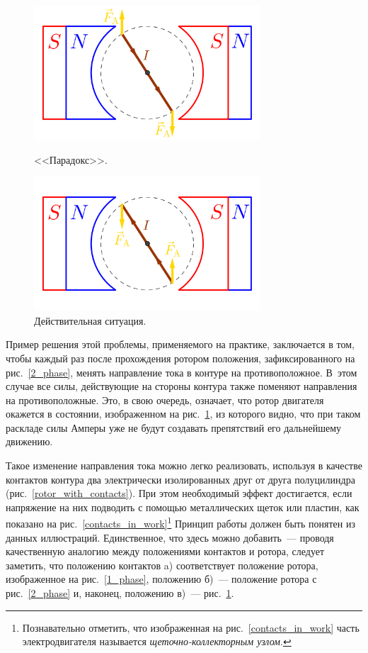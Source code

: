 \documentclass[12pt, a4paper, openany]{extarticle}
\begin{document}
\begin{figure}[h]
	\begin{center}
		\begin{minipage}[h]{0.49\linewidth}
			\centering\includegraphics[height=5cm]{pics/phase_3.png}
			\caption{<<Парадокс>>.}
			\label{3_phase} 
		\end{minipage}
		\hfill 
		\begin{minipage}[h]{0.49\linewidth}
			\centering\includegraphics[height=5cm]{pics/phase_4.png}
			\caption{Действительная ситуация.}
			\label{4_phase}
		\end{minipage}
	\end{center}
\end{figure}

Пример решения этой проблемы, применяемого на практике, заключается в том, чтобы каждый раз после прохождения ротором положения, зафиксированного на рис.~\ref{2_phase}, менять направление тока в контуре на противоположное. 
В~этом случае все силы, действующие на стороны контура также поменяют направления на противоположные. 
Это, в свою очередь, означает, что ротор двигателя окажется в состоянии, изображенном на рис.~\ref{4_phase}, из которого видно, что при таком раскладе силы Амперы уже не будут создавать препятствий его дальнейшему движению.

Такое изменение направления тока можно легко реализовать, используя в качестве контактов контура два электрически изолированных друг от друга полуцилиндра (рис.~\ref{rotor_with_contacts}).
При этом необходимый эффект достигается, если напряжение на них подводить с помощью металлических щеток или пластин, как показано на рис.~\ref{contacts_in_work}\footnote{Познавательно отметить, что изображенная на рис.~\ref{contacts_in_work} часть электродвигателя называется \textit{щеточно-коллекторным узлом}.} 
Принцип работы должен быть понятен из данных иллюстраций. 
Единственное, что здесь можно добавить~--- проводя качественную аналогию между положениями контактов и ротора, следует заметить, что положению контактов a) соответствует положение ротора, изображенное на рис.~\ref{1_phase}, положению б)~--- положение ротора с рис.~\ref{2_phase} и, наконец, положению в)~--- рис.~\ref{4_phase}.
\end{document}
